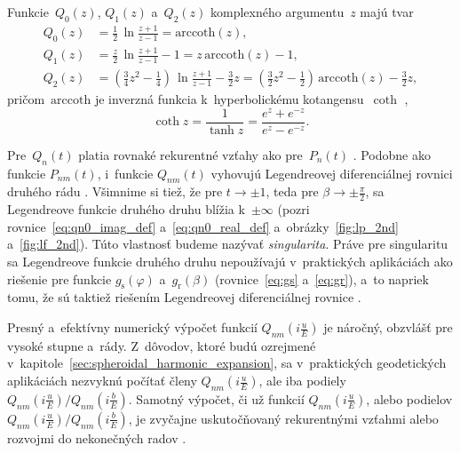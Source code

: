 \documentclass[a4paper, 12pt]{book}
\begin{document}
Funkcie~$Q_0\left( z \right)$, $Q_1\left( z \right)$ a~$Q_2\left( z \right)$ 
komplexného argumentu~$z$ majú tvar
%
\begin{align}
\label{eq:q0z}
Q_0(z) &= \frac{1}{2} \, \ln\frac{z + 1}{z - 1} = \mathrm{arccoth}(z){,}\\
%
\label{eq:q1z}
Q_1(z) &= \frac{z}{2} \, \ln\frac{z + 1}{z - 1} - 1 = z \, \mathrm{arccoth}(z)- 
 1{,}\\
%
\label{eq:q2z}
Q_2(z) &= \left( \frac{3}{4} z^2 - \frac{1}{4} \right) \, \ln\frac{z + 1}{z 
- 1} - \frac{3}{2}z = \left( \frac{3}{2} z^2 - \frac{1}{2} \right) \, 
\mathrm{arccoth}(z) - \frac{3}{2}z{,}
\end{align}
%
pričom~$\mathrm{arccoth}$ je inverzná funkcia k~hyperbolickému 
kotangensu~$\coth$ \parencite{Gradshteyn2007},
%
\begin{equation}
\coth z = \frac{1}{\tanh z} =  \frac{e^z + e^{-z}}{e^z - e^{-z}}{.}
\end{equation}

Pre~$Q_n(t)$ platia rovnaké rekurentné vzťahy ako pre~$P_n(t)$ 
\parencite{MoritzPhysicalGeodesy}.  Podobne ako funkcie $P_{nm}(t)$, i~funkcie 
$Q_{nm}(t)$ vyhovujú Legendreovej diferenciálnej rovnici druhého rádu 
\parencite[pozri rovnicu
\ref{eq:legfunc1_differential_equation};][]{MoritzPhysicalGeodesy}.  Všimnime 
si tiež, že pre $t \rightarrow \pm 1$, teda pre $\beta \rightarrow \pm 
\frac{\pi}{2}$, sa Legendreove funkcie druhého druhu blížia k~$\pm \infty$ 
(pozri rovnice~\ref{eq:qn0_imag_def} a~\ref{eq:qn0_real_def} 
a~obrázky~\ref{fig:lp_2nd} a~\ref{fig:lf_2nd}).  Túto vlastnosť budeme nazývať 
\emph{singularita}.  Práve pre singularitu sa Legendreove funkcie druhého druhu 
nepoužívajú v~praktických aplikáciách ako riešenie pre funkcie 
$g_\mathrm{s}(\varphi)$ a~$g_\mathrm{r}(\beta)$ (rovnice~\ref{eq:gs} 
a~\ref{eq:gr}), a~to napriek tomu, že sú taktiež riešením Legendreovej 
diferenciálnej rovnice \parencite{MoritzPhysicalGeodesy}.

Presný a~efektívny numerický výpočet funkcií $Q_{nm}\left( i \frac{u}{E} 
\right)$ je náročný, obzvlášť pre vysoké stupne a~rády.  Z~dôvodov, ktoré budú 
ozrejmené v~kapitole~\ref{sec:spheroidal_harmonic_expansion}, sa v~praktických 
geodetických aplikáciách nezvyknú počítať členy $Q_{nm}\left( i \frac{u}{E} 
\right)$, ale iba podiely $Q_{nm}\left( i \frac{u}{E} \right) \slash 
Q_{nm}\left( i \frac{b}{E} \right)$.  Samotný výpočet, či už funkcií 
$Q_{nm}\left( i \frac{u}{E} \right)$, alebo podielov $Q_{nm}\left( 
i \frac{u}{E} \right) \slash Q_{nm}\left( i \frac{b}{E} \right)$, je zvyčajne 
uskutočňovaný rekurentnými vzťahmi alebo rozvojmi do nekonečných radov 
\parencite[pozri napríklad][]{Sebera2012,Fukushima2013,Wang2013,Sprlak2020}.
\end{document}
